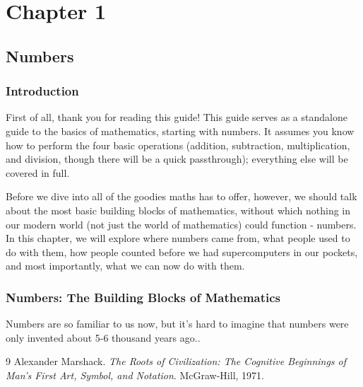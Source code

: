 \documentclass{article}
\begin{document}
    \section*{Chapter 1}
    \subsection*{Numbers}

    \subsubsection{Introduction}
    \par
    First of all, thank you for reading this guide!
    \newline
    This guide serves as a standalone guide to the basics of mathematics, starting with numbers. 
    It assumes you know how to perform the four basic operations (addition, subtraction, multiplication, and division, though there will be a quick passthrough); everything else will be covered in full.
    \par

    Before we dive into all of the goodies maths has to offer, however, we should talk about the most basic building blocks of mathematics, without which nothing in our modern world (not just the world of mathematics) could function - numbers.
    \newline
    In this chapter, we will explore where numbers came from, what people used to do with them, how people counted before we had supercomputers in our pockets, and most importantly, what we can now do with them.

    \subsubsection{Numbers: The Building Blocks of Mathematics}
    \par
    Numbers are so familiar to us now, but it's hard to imagine that numbers were only invented about 5-6 thousand years ago.\cite{marshack1971}.
    


\begin{thebibliography}{9}
    Alexander Marshack.
    \textit{The Roots of Civilization: The Cognitive Beginnings of Man's First Art, Symbol, and Notation}.
    McGraw-Hill, 1971.
\end{thebibliography}
\end{document}
